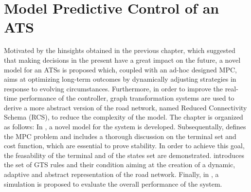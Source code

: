 \chapter{Model Predictive Control of an ATS}\label{ch:mpc}
Motivated by the hinsights obtained in the previous chapter, which suggested that making decisions in the present have a great impact on the future, a novel model for an ATSs is proposed which, coupled with an ad-hoc designed MPC, aims at optimizing long-term outcomes by dynamically adjusting strategies in response to evolving circumstances. Furthermore, in order to improve the real-time performance of the controller, graph transformation systems are used to derive a more abstract version of the road network, named Reduced Connectivity Schema (RCS), to reduce the complexity of the model. The chapter is organized as follows:
 In , a novel model for the system is developed. Subsequentally,  defines the MPC problem and includes a thorough discussion on the terminal set and cost function, which are essential to prove stability. In order to achieve this goal, the feasability of the terminal and of the states set are demonstrated.  introduces the set of GTS rules and their condition aiming at the creation of a dynamic, adaptive and abstract representation of the road network. Finally, in , a simulation is proposed to evaluate the overall performance of the system. 
